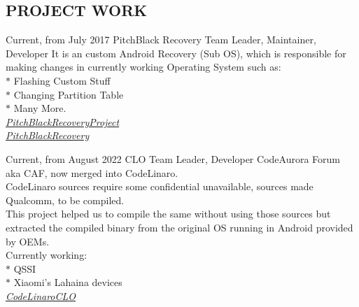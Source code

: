 \documentclass[
	10pt, %
	]{FreemanCV}
\begin{document}
\begin{paracol}{2}

\section{PROJECT WORK}





\jobentry
	{Current, from July 2017} %
	{} %
	{PitchBlack Recovery} %
	{Team Leader, Maintainer, Developer} %
	{It is an custom Android Recovery (Sub OS), which is responsible for making changes in currently working Operating System such as:\\
	 $*$ Flashing Custom Stuff\\
	 $*$ Changing Partition Table\\
	 $*$ Many More.\\
	\raisebox{-1pt}{\faGithubSquare} \href{https://github.com/PitchBlackRecoveryProject}{\textit{PitchBlackRecoveryProject}}\\
	\raisebox{-1pt}{\faGlobe} \href{https://pitchblackrecovery.com}{\textit{PitchBlackRecovery}}} %


\jobentry
	{Current, from August 2022} %
	{} %
	{CLO} %
	{Team Leader, Developer} %
	{CodeAurora Forum aka CAF, now merged into CodeLinaro. \\
	CodeLinaro sources require some confidential unavailable, sources made Qualcomm, to be compiled. \\
	This project helped us to compile the same without using those sources but extracted the compiled binary from the original OS running in Android provided by OEMs. \\
	Currently working:\\
	 $*$ QSSI\\
	 $*$ Xiaomi's Lahaina devices\\
	\raisebox{-1pt}{\faGithubSquare} \href{https://github.com/CodeLinaroCLO}{\textit{CodeLinaroCLO}}} %



\end{paracol}
\end{document}
